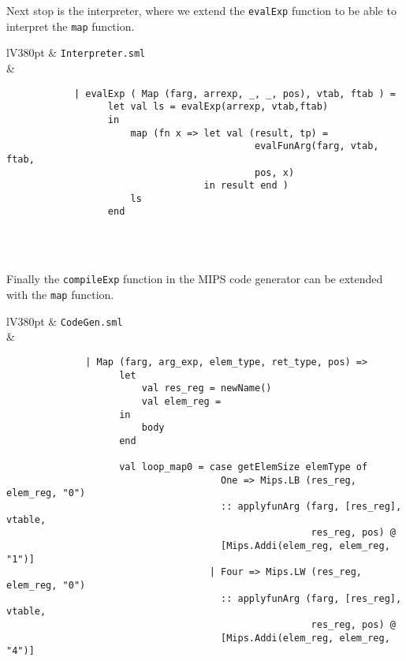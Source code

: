 \documentclass[a4paper]{article}
\begin{document}
Next stop is the interpreter, where we extend the \verb|evalExp| function to be able to interpret the \verb|map| function.
	
\begin{center}	
	\begin{tabular}{lV{380pt}}
		\toprule
		& \verb|Interpreter.sml|\\
		\midrule
		&
		\begin{verbatim}
			| evalExp ( Map (farg, arrexp, _, _, pos), vtab, ftab ) = 
			      let val ls = evalExp(arrexp, vtab,ftab)
			      in
			          map (fn x => let val (result, tp) =
			                                evalFunArg(farg, vtab, ftab, 
			                                pos, x)
			                       in result end ) 
			          ls
			      end
		\end{verbatim}
		\\
		\bottomrule \\
	\end{tabular}
\end{center}
	
Finally the \verb|compileExp| function in the MIPS code generator can be extended with the \verb|map| function.
	
\begin{center}	
	\begin{tabular}{lV{380pt}}
		\toprule
		& \verb|CodeGen.sml|\\
		\midrule
		&
		\begin{verbatim}
			  | Map (farg, arg_exp, elem_type, ret_type, pos) => 
			        let
			            val res_reg = newName()
			            val elem_reg = 
			        in
			            body
			        end
			        
			        val loop_map0 = case getElemSize elemType of
			                          One => Mips.LB (res_reg, elem_reg, "0") 
			                          :: applyfunArg (farg, [res_reg], vtable,
			                                          res_reg, pos) @ 
			                          [Mips.Addi(elem_reg, elem_reg, "1")]
			                        | Four => Mips.LW (res_reg, elem_reg, "0")
			                          :: applyfunArg (farg, [res_reg], vtable,
			                                          res_reg, pos) @ 
			                          [Mips.Addi(elem_reg, elem_reg, "4")]
		\end{verbatim}
		\\
		\bottomrule \\
	\end{tabular}
\end{center}
\end{document}
